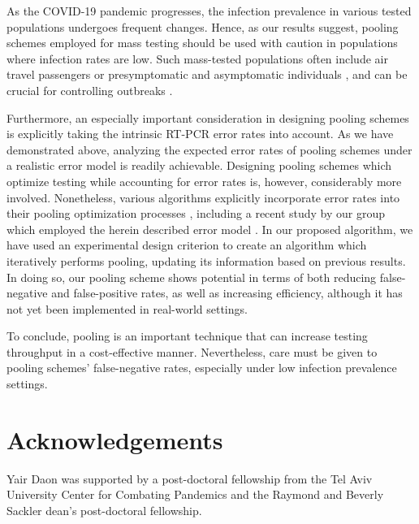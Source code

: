 \documentclass{article}
\begin{document}
As the COVID-19 pandemic progresses, the infection prevalence in
various tested populations undergoes frequent changes. Hence, as our
results suggest, pooling schemes employed for mass testing should be
used with caution in populations where infection rates are low. Such
mass-tested populations often include air travel passengers \cite{JTM}
or presymptomatic and asymptomatic individuals \cite{RobinHood}, and
can be crucial for controlling outbreaks \cite{MinaScience}.

Furthermore, an especially important consideration in designing
pooling schemes is explicitly taking the intrinsic RT-PCR error rates
into account. As we have demonstrated above, analyzing the expected
error rates of pooling schemes under a realistic error
model is readily achievable. Designing pooling schemes which optimize
testing while accounting for error rates is, however, considerably more involved.
Nonetheless, various algorithms explicitly incorporate error
rates into their pooling optimization processes \cite{Kim, OptimalDorfmanPool}, including a
recent study by our group which employed the herein described error
model \cite{DOPE}.  In our proposed algorithm, we have used an
experimental design criterion to create an algorithm which iteratively
performs pooling, updating its information based on previous
results. In doing so, our pooling scheme shows potential in terms of
both reducing false-negative and false-positive rates, as well as increasing efficiency,
although it has not yet been implemented in real-world settings.

To conclude, pooling is an important technique that can increase
testing throughput in a cost-effective manner. Nevertheless, care must
be given to pooling schemes' false-negative rates, especially under
low infection prevalence settings.

\section*{Acknowledgements}
Yair Daon was supported by a post-doctoral fellowship from the Tel
Aviv University Center for Combating Pandemics and the Raymond and
Beverly Sackler dean's post-doctoral fellowship.



\end{document}
